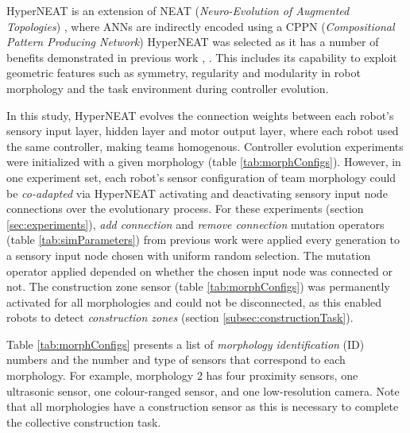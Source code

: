 \documentclass[conference]{IEEEtran}
\begin{document}
HyperNEAT \cite{StanleyDAmbrosioGauci2009} is an extension of NEAT (\textit{Neuro-Evolution of Augmented Topologies})
\cite{StanleyMiikkulainen2002}, where ANNs are indirectly encoded using a CPPN (\textit{Compositional Pattern Producing Network})
\cite{Stanley2007}
HyperNEAT was selected as it has a number of benefits demonstrated in previous work \cite{DAmbrosio2013},
\cite{WatsonNitschke2015SSCI}.
This includes its capability to exploit geometric features such as symmetry, regularity and modularity
in robot morphology and the task environment during controller evolution.

In this study, HyperNEAT evolves the connection weights between each robot's sensory input layer,
hidden layer and motor output layer, where each robot used the same controller, making teams
homogenous.
Controller evolution experiments were initialized with a given morphology (table \ref{tab:morphConfigs}).
However, in one experiment set, each robot's sensor configuration of team morphology could be
\textit{co-adapted} via HyperNEAT activating and deactivating sensory input node connections over
the evolutionary process.
For these experiments (section \ref{sec:experiments}), \textit{add connection} and
\textit{remove connection} mutation operators (table \ref{tab:simParameters}) from previous work
\cite{HewlandNitschke2015} were applied every generation to a sensory input node
chosen with uniform random selection.  The mutation operator applied depended on whether the chosen input
node was connected or not.  The construction zone sensor (table \ref{tab:morphConfigs}) was permanently activated
for all morphologies and could not be disconnected, as this enabled robots to detect \textit{construction zones}
(section \ref{subsec:constructionTask}).

Table \ref{tab:morphConfigs} presents a list of \textit{morphology identification} (ID) numbers and the
number and type of sensors that correspond to each morphology.
For example, morphology 2 has four proximity sensors, one ultrasonic sensor, one colour-ranged sensor, and
one low-resolution camera.
Note that all morphologies have a construction sensor as this is necessary to complete the collective construction task.

\end{document}
